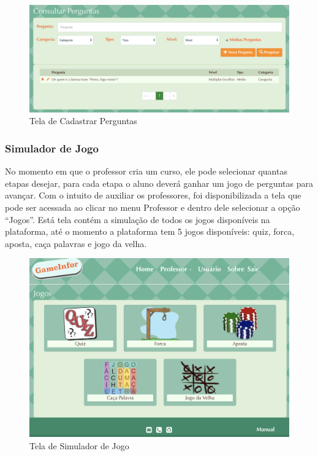\begin{figure}[H]
  \centering
  \includegraphics[scale=0.4]{images/proposta-img/Figura4-20.png}
  \caption{Tela de Cadastrar Perguntas}
  \label{fig:Figura4-20}
\end{figure}

\subsubsection{Simulador de Jogo}
No momento em que o professor cria um curso, ele pode selecionar quantas etapas desejar, para cada etapa o aluno deverá ganhar um jogo de perguntas para avançar. Com o intuito de auxiliar os professores, foi disponibilizada a tela  que pode ser acessada ao clicar no menu Professor e dentro dele selecionar a opção “Jogos”. Está tela contém a simulação de todos os jogos disponíveis na plataforma, até o momento a plataforma tem 5 jogos disponíveis: quiz, forca, aposta, caça palavras e jogo da velha. 
\begin{figure}[H]
  \centering
  \includegraphics[scale=0.25]{images/proposta-img/Figura4-21.png}
  \caption{Tela de Simulador de Jogo}
  \label{fig:Figura4-21}
\end{figure}

